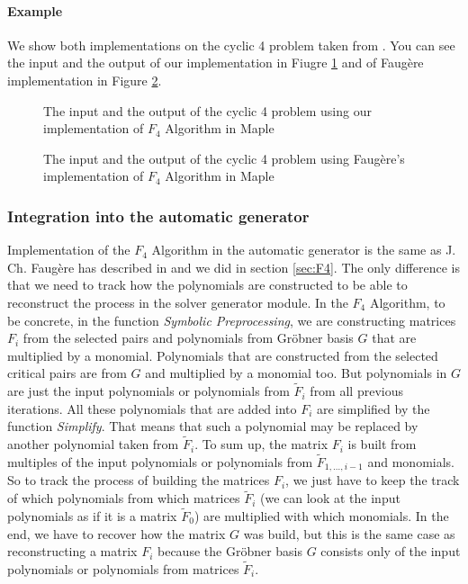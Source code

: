 \paragraph{Example} We show both implementations on the cyclic 4 problem taken from \cite{F4}. You can see the input and the output of our implementation in Fiugre \ref{fig:F4:our} and of Faug\`ere implementation in Figure \ref{fig:F4:Faug}.

\begin{figure}[!ht]
  \centering
  
  \caption{The input and the output of the cyclic 4 problem using our implementation of $F_4$ Algorithm in Maple}
  \label{fig:F4:our}
\end{figure}

\begin{figure}[!ht]
  \centering
  
  \caption{The input and the output of the cyclic 4 problem using Faug\`ere's implementation of $F_4$ Algorithm in Maple}
  \label{fig:F4:Faug}
\end{figure}

\subsubsection{Integration into the automatic generator}
Implementation of the $F_4$ Algorithm in the automatic generator is the same as J. Ch. Faug\`ere has described in \cite{F4} and we did in section \ref{sec:F4}. The only difference is that we need to track how the polynomials are constructed to be able to reconstruct the process in the solver generator module. In the $F_4$ Algorithm, to be concrete, in the function \textit{Symbolic Preprocessing}, we are constructing matrices $F_i$ from the selected pairs and polynomials from Gr\"obner basis $G$ that are multiplied by a monomial. Polynomials that are constructed from the selected critical pairs are from $G$ and multiplied by a monomial too. But polynomials in $G$ are just the input polynomials or polynomials from $\tilde{F}_i$ from all previous iterations. All these polynomials that are added into $F_i$ are simplified by the function \textit{Simplify}. That means that such a polynomial may be replaced by another polynomial taken from $\tilde{F}_i$. To sum up, the matrix $F_i$ is built from multiples of the input polynomials or polynomials from $\tilde{F}_{1,\dots, i-1}$ and monomials. So to track the process of building the matrices $F_i$, we just have to keep the track of which polynomials from which matrices $\tilde{F}_i$ (we can look at the input polynomials as if it is a matrix $\tilde{F}_0$) are multiplied with which monomials. In the end, we have to recover how the matrix $G$ was build, but this is the same case as reconstructing a matrix $F_i$ because the Gr\"obner basis $G$ consists only of the input polynomials or polynomials from matrices $\tilde{F}_i$.

